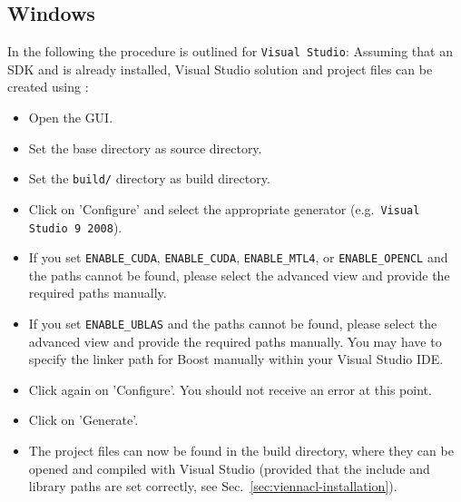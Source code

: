 \subsection{Windows}
In the following the procedure is outlined for \texttt{Visual Studio}: Assuming that an {\OpenCL} SDK and {\CMake} is already installed, Visual Studio solution and project files can be created using {\CMake}:
\begin{itemize}
\item Open the {\CMake} GUI.
\item Set the {\ViennaCL} base directory as source directory.
\item Set the \texttt{build/} directory as build directory.
\item Click on 'Configure' and select the appropriate generator (e.g.~\texttt{Visual Studio 9 2008}).
\item If you set \lstinline|ENABLE_CUDA|, \lstinline|ENABLE_CUDA|, \lstinline|ENABLE_MTL4|, or \lstinline|ENABLE_OPENCL| and the paths cannot be found, please select the advanced view and provide the required paths manually.
\item If you set \lstinline|ENABLE_UBLAS| and the paths cannot be found, please select the advanced view and provide the required paths manually. You may have to specify the linker path for Boost manually within your Visual Studio IDE.
\item Click again on 'Configure'. You should not receive an error at this point.
\item Click on 'Generate'.
\item The project files can now be found in the {\ViennaCL} build directory, where they can be opened and compiled with Visual Studio (provided that the include and library paths are set correctly, see Sec.~\ref{sec:viennacl-installation}).
\end{itemize}







